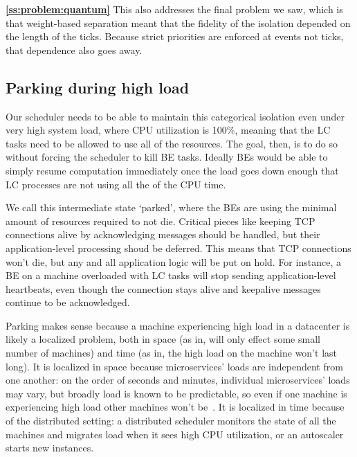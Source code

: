 \textbf{\autoref{ss:problem:quantum}} This also addresses the final problem we
saw, which is that weight-based separation meant that the fidelity of the
isolation depended on the length of the ticks. Because strict priorities are
enforced at events not ticks, that dependence also goes away.

\subsection{Parking during high load}\label{ss:approach:parking}

Our scheduler needs to be able to maintain this categorical isolation even under
very high system load, where CPU utilization is 100\%, meaning that the LC tasks
need to be allowed to use all of the resources. The goal, then, is to do so without forcing the
scheduler to kill BE tasks. Ideally BEs would be able to simply resume
computation immediately once the load goes down enough that LC processes are not
using all the of the CPU time.

We call this intermediate state `parked', where the BEs are using the minimal
amount of resources required to not die. Critical pieces like keeping TCP
connections alive by acknowledging messages should be handled, but their
application-level processing shoud be deferred. This means that TCP connections
won't die, but any and all application logic will be put on hold. For instance, a
BE on a machine overloaded with LC tasks will stop sending application-level
heartbeats, even though the connection stays alive and keepalive messages
continue to be acknowledged.

Parking makes sense because a machine experiencing high load in a datacenter is
likely a localized problem, both in space (as in, will only effect some small
number of machines) and time (as in, the high load on the machine won't last
long). It is localized in space because microservices' loads are independent
from one another: on the order of seconds and minutes, individual microservices'
loads may vary, but broadly load is known to be predictable, so even if one
machine is experiencing high load other machines won't be~\cite{TODO}. It is
localized in time because of the distributed setting: a distributed scheduler
monitors the state of all the machines and migrates load when it sees high CPU
utilization, or an autoscaler starts new instances.